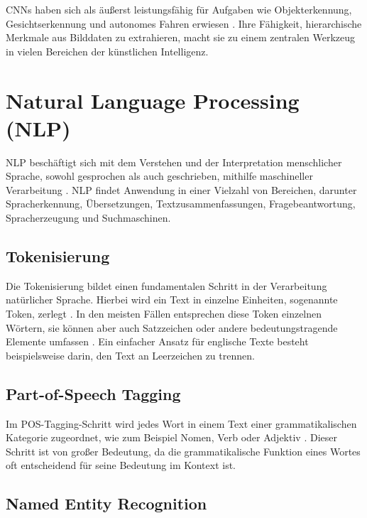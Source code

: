 CNNs haben sich als äußerst leistungsfähig für Aufgaben wie Objekterkennung, Gesichtserkennung und autonomes Fahren erwiesen \parencite{RebalaGopinath2019AItM}. Ihre Fähigkeit, hierarchische Merkmale aus Bilddaten zu extrahieren, macht sie zu einem zentralen Werkzeug in vielen Bereichen der künstlichen Intelligenz.

\section{Natural Language Processing (NLP)}
\label{sec:nlp}

\gls{NLP} beschäftigt sich mit dem Verstehen und der Interpretation menschlicher Sprache, sowohl gesprochen als auch geschrieben, mithilfe maschineller Verarbeitung \parencite{RebalaGopinath2019AItM}. \gls{NLP} findet Anwendung in einer Vielzahl von Bereichen, darunter Spracherkennung, Übersetzungen, Textzusammenfassungen, Fragebeantwortung, Spracherzeugung und Suchmaschinen.

\subsection{Tokenisierung}
\label{subsec:tokenisierung}

Die Tokenisierung bildet einen fundamentalen Schritt in der Verarbeitung natürlicher Sprache. Hierbei wird ein Text in einzelne Einheiten, sogenannte Token, zerlegt \parencite{RebalaGopinath2019AItM}. In den meisten Fällen entsprechen diese Token einzelnen Wörtern, sie können aber auch Satzzeichen oder andere bedeutungstragende Elemente umfassen \parencite{RebalaGopinath2019AItM}. 
Ein einfacher Ansatz für englische Texte besteht beispielsweise darin, den Text an Leerzeichen zu trennen.

\subsection{Part-of-Speech Tagging}
\label{subsec:pos-tagging}

Im \gls{POS}-Tagging-Schritt wird jedes Wort in einem Text einer grammatikalischen Kategorie zugeordnet, wie zum Beispiel Nomen, Verb oder Adjektiv \parencite{RebalaGopinath2019AItM}. Dieser Schritt ist von großer Bedeutung, da die grammatikalische Funktion eines Wortes oft entscheidend für seine Bedeutung im Kontext ist.

\subsection{Named Entity Recognition}
\label{subsec:ner}

